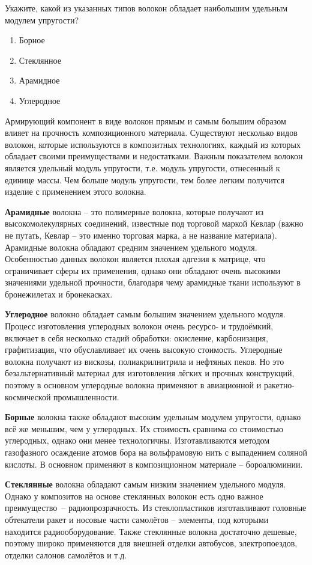 
Укажите, какой из указанных типов волокон обладает наибольшим удельным модулем упругости?

\begin{enumerate}
    \item Борное
    \item Стеклянное
    \item Арамидное
    \item Углеродное
\end{enumerate}

\explanationSection

Армирующий компонент в виде волокон прямым и самым большим образом влияет на прочность композиционного материала. Существуют несколько видов волокон, которые используются в композитных технологиях, каждый из которых обладает своими преимуществами и недостатками. Важным показателем волокон является удельный модуль упругости, т.е. модуль упругости, отнесенный к единице массы. Чем больше модуль упругости, тем более легким получится изделие с применением этого волокна.

\textbf{Арамидные} волокна – это полимерные волокна, которые получают из высокомолекулярных соединений, известные под торговой маркой Кевлар (важно не путать, Кевлар – это именно торговая марка, а не название материала). Арамидные волокна обладают средним значением удельного модуля. Особенностью данных волокон является плохая адгезия к матрице, что ограничивает сферы их применения, однако они обладают очень высокими значениями удельной прочности, благодаря чему арамидные ткани используют в бронежилетах и бронекасках. 

\textbf{Углеродное} волокно обладает самым большим значением удельного модуля. Процесс изготовления углеродных волокон очень ресурсо- и трудоёмкий, включает в себя несколько стадий обработки: окисление, карбонизация, графитизация, что обуславливает их очень высокую стоимость. Углеродные волокна получают из вискозы, полиакрилнитрила и нефтяных пеков. Но это безальтернативный материал для изготовления лёгких и прочных конструкций, поэтому в основном углеродные волокна применяют в авиационной и ракетно-космической промышленности.

\textbf{Борные} волокна также обладают высоким удельным модулем упругости, однако всё же меньшим, чем у углеродных. Их стоимость сравнима со стоимостью углеродных, однако они менее технологичны. Изготавливаются методом газофазного осаждение атомов бора на вольфрамовую нить с выпадением соляной кислоты. В основном применяют в композиционном материале – бороалюминии.

\textbf{Стеклянные} волокна обладают самым низким значением удельного модуля. Однако у композитов на основе 
стеклянных волокон есть одно важное преимущество~– радиопрозрачность. Из стеклопластиков изготавливают головные 
обтекатели ракет и носовые части самолётов – элементы, под которыми находится радиооборудование. Также стеклянные волокна достаточно дешевые, поэтому широко применяются для внешней отделки автобусов, электропоездов, отделки салонов самолётов и т.д.

